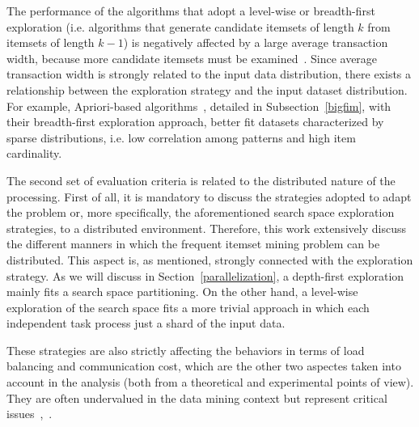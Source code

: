 The performance of the algorithms that adopt a level-wise or breadth-first exploration  (i.e. algorithms that generate candidate itemsets of length $k$ from itemsets of length $k-1$) is negatively affected by a large average transaction width, because more candidate itemsets must be examined~\cite{KumarBook}. Since average transaction width is strongly related to the input data distribution, there exists a relationship between the exploration strategy and the input dataset distribution. For example, Apriori-based algorithms~\cite{Agr94}, detailed in Subsection~\ref{bigfim}, with their breadth-first exploration approach, better fit datasets characterized by
sparse distributions, i.e. low correlation among patterns and high item cardinality.




The second set of evaluation criteria is related to the distributed nature of
the processing. First of all, it is mandatory to discuss the strategies adopted to adapt the problem or, more specifically, the aforementioned search space exploration strategies, to a distributed environment. Therefore, this work extensively discuss the different manners in which the frequent itemset mining problem can be distributed. This aspect is, as mentioned, strongly connected with the exploration strategy. As we will discuss in Section~\ref{parallelization}, a depth-first exploration mainly fits a search space partitioning. On the other hand, a level-wise exploration of the search space fits a more trivial approach in which each independent task process just a shard of the input data. 

These strategies are also strictly affecting the behaviors in terms of load balancing and communication cost, which are the other two aspectes taken into account in the analysis (both from a theoretical and experimental points of view).
They are often undervalued in the data mining context but
represent critical
issues~\cite{afrati2012designing},~\cite{leskovec2014mining}.

